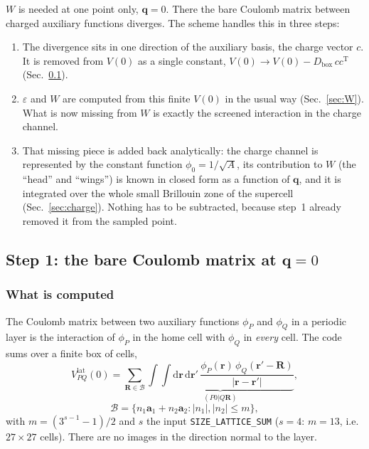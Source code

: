 \documentclass[%
 reprint,
superscriptaddress,
 amsmath,amssymb,
 aps,
prb,
]{revtex4-2}
\newcommand{\br}{\mathbf{r}}
\newcommand{\bR}{\mathbf{R}}
\newcommand{\bq}{\mathbf{q}}
\newcommand{\dd}{\mathrm{d}}
\newcommand{\Tr}{\mathrm{T}}
\newcommand{\lat}{\mathrm{lat}}
\begin{document}
$W$ is needed at one point only, $\bq=0$. There the bare Coulomb matrix between charged
auxiliary functions diverges. The scheme handles this in three steps:
\begin{enumerate}
\item The divergence sits in one direction of the auxiliary basis, the charge vector $c$. It is
  removed from $V(0)$ as a single constant, $V(0)\to V(0)-D_\mathrm{box}\,cc^\Tr$
  (Sec.~\ref{sec:V}).
\item $\varepsilon$ and $W$ are computed from this finite $V(0)$ in the usual way
  (Sec.~\ref{sec:W}). What is now missing from $W$ is exactly the screened interaction in the
  charge channel.
\item That missing piece is added back analytically: the charge channel is represented by the
  constant function $\phi_0 = 1/\sqrt A$, its contribution to $W$ (the ``head'' and ``wings'')
  is known in closed form as a function of $\bq$, and it is integrated over the whole small
  Brillouin zone of the supercell (Sec.~\ref{sec:charge}). Nothing has to be subtracted,
  because step~1 already removed it from the sampled point.
\end{enumerate}

\subsection{Step 1: the bare Coulomb matrix at $\bq=0$}
\label{sec:V}

\subsubsection{What is computed}

The Coulomb matrix between two auxiliary functions $\phi_P$ and $\phi_Q$ in a periodic layer is
the interaction of $\phi_P$ in the home cell with $\phi_Q$ in \emph{every} cell. The code sums
over a finite box of cells,
\begin{equation}
  V^\lat_{PQ}(0) = \sum_{\bR\in\mathcal B}\underbrace{\int\!\!\int\dd\br\,\dd\br'\,
  \frac{\phi_P(\br)\,\phi_Q(\br'-\bR)}{|\br-\br'|}}_{(P0|Q\bR)},
  \label{eq:Vlat}
\end{equation}
\begin{equation}
  \mathcal B = \{n_1\mathbf a_1+n_2\mathbf a_2 : |n_1|,|n_2|\le m\},
  \label{eq:box}
\end{equation}
with $m = (3^{s-1}-1)/2$ and $s$ the input \texttt{SIZE\_LATTICE\_SUM} ($s=4$: $m=13$, i.e.\
$27\times27$ cells). There are no images in the direction normal to the layer.
\end{document}
